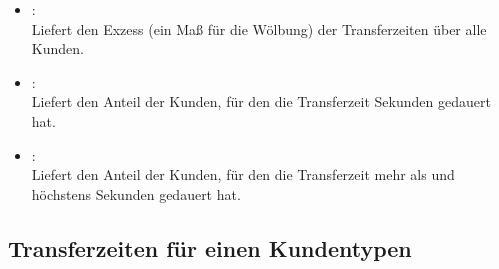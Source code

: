 \begin{itemize}
\item
{}:\\
Liefert den Exzess (ein Maß für die Wölbung) der Transferzeiten über alle Kunden.

\item
{}:\\
Liefert den Anteil der Kunden, für den die Transferzeit  Sekunden gedauert hat.

\item
{}:\\
Liefert den Anteil der Kunden, für den die Transferzeit mehr als  und höchstens  Sekunden gedauert hat.

\end{itemize}  



\subsection{Transferzeiten für einen Kundentypen}

